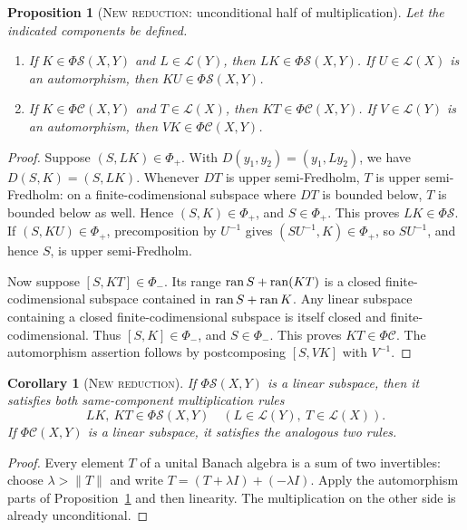 \documentclass[11pt]{article}
\newtheorem{proposition}[theorem]{Proposition}
\newtheorem{corollary}[theorem]{Corollary}
\theoremstyle{definition}
\newcommand{\Lop}{\mathcal L}
\newcommand{\PhiS}{\Phi\mathcal S}
\newcommand{\PhiC}{\Phi\mathcal C}
\newcommand{\PhiP}{\Phi_+}
\newcommand{\PhiM}{\Phi_-}
\newcommand{\ran}{\mathop{\rm ran}}
\newcommand{\newresult}{\textcolor{newblue}{\textsc{New reduction}}}
\begin{document}
\begin{proposition}[\newresult: unconditional half of multiplication]\label{prop:mult}
Let the indicated components be defined.
\begin{enumerate}[label=\rm(\roman*)]
\item If \(K\in\PhiS(X,Y)\) and \(L\in\Lop(Y)\), then \(LK\in\PhiS(X,Y)\).
If \(U\in\Lop(X)\) is an automorphism, then \(KU\in\PhiS(X,Y)\).
\item If \(K\in\PhiC(X,Y)\) and \(T\in\Lop(X)\), then \(KT\in\PhiC(X,Y)\).
If \(V\in\Lop(Y)\) is an automorphism, then \(VK\in\PhiC(X,Y)\).
\end{enumerate}
\end{proposition}

\begin{proof}
Suppose \((S,LK)\in\PhiP\).  With
\(D(y_1,y_2)=(y_1,Ly_2)\), we have \(D(S,K)=(S,LK)\).  Whenever \(DT\) is upper
semi-Fredholm, \(T\) is upper semi-Fredholm: on a finite-codimensional subspace where
\(DT\) is bounded below, \(T\) is bounded below as well.  Hence \((S,K)\in\PhiP\), and
\(S\in\PhiP\).  This proves \(LK\in\PhiS\).  If \((S,KU)\in\PhiP\), precomposition
by \(U^{-1}\) gives \((SU^{-1},K)\in\PhiP\), so \(SU^{-1}\), and hence \(S\), is
upper semi-Fredholm.

Now suppose \([S,KT]\in\PhiM\).  Its range
\(\ran S+\ran(KT)\) is a closed finite-codimensional subspace contained in
\(\ran S+\ran K\).  Any linear subspace containing a closed finite-codimensional
subspace is itself closed and finite-codimensional.  Thus \([S,K]\in\PhiM\), and
\(S\in\PhiM\).  This proves \(KT\in\PhiC\).  The automorphism assertion follows by
postcomposing \([S,VK]\) with \(V^{-1}\).
\end{proof}

\begin{corollary}[\newresult]\label{cor:linear-mult}
If \(\PhiS(X,Y)\) is a linear subspace, then it satisfies both same-component
multiplication rules
\[
 LK,\ KT\in\PhiS(X,Y)
 \quad(L\in\Lop(Y),\ T\in\Lop(X)).
\]
If \(\PhiC(X,Y)\) is a linear subspace, it satisfies the analogous two rules.
\end{corollary}

\begin{proof}
Every element \(T\) of a unital Banach algebra is a sum of two invertibles: choose
\(\lambda>\|T\|\) and write
\(T=(T+\lambda I)+(-\lambda I)\).  Apply the automorphism parts of
Proposition~\ref{prop:mult} and then linearity.  The multiplication on the other side is
already unconditional.
\end{proof}
\end{document}
